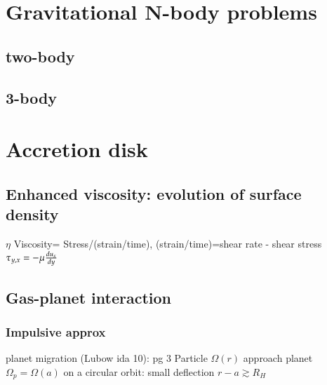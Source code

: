 \chapter{Gravitational N-body problems}

\section{two-body}

\section{3-body}

\chapter{Accretion disk}

\section{Enhanced viscosity: evolution of surface density}

$\eta$ Viscosity= Stress/(strain/time), (strain/time)=shear rate - shear stress $\tau_{y,x}=-\mu\TDy{y}{u_x}$


\section{Gas-planet interaction}
 
\subsection{Impulsive approx}
planet migration (Lubow ida 10): pg 3
Particle $\Omega(r)$ approach planet $\Omega_p=\Omega(a)$ on a circular orbit: small deflection $r-a\gtrsim R_H$
 
 
 
 
 
 
 
 